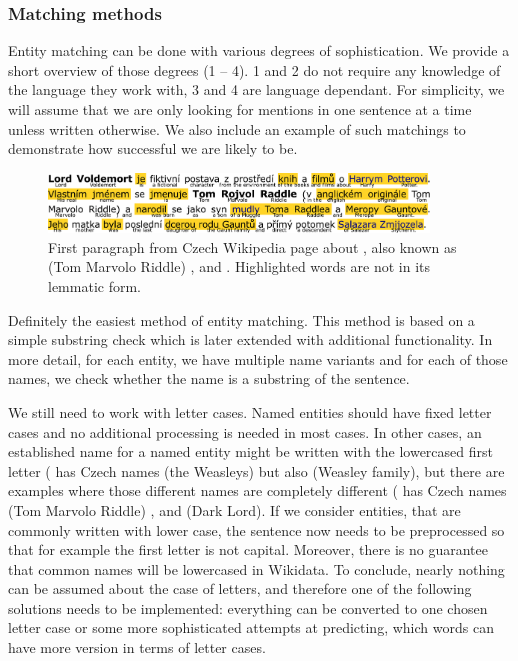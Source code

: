\subsubsection{Matching methods}
Entity matching can be done with various degrees of sophistication. We provide a short overview of those degrees (1 -- 4). 1 and 2 do not require any knowledge of the language they work with, 3 and 4 are language dependant. For simplicity, we will assume that we are only looking for mentions in one sentence at a time unless written otherwise. We also include an example of such matchings to demonstrate how successful we are likely to be.

\begin{figure}
\centering
\includegraphics[width = 0.9\textwidth]{./img/Voldemort_infinitivy_preklad}

\caption{First paragraph from Czech Wikipedia page about , also known as  (Tom Marvolo Riddle) , and . Highlighted words are not in its lemmatic form. }
\label{obr:Voldemort_preklad}

\end{figure}


 Definitely the easiest method of entity matching. This method is based on a simple substring check which is later extended with additional functionality. In more detail, for each entity, we have multiple name variants and for each of those names, we check whether the name is a substring of the sentence.



We still need to work with letter cases. Named entities should have fixed letter cases and no additional processing is needed in most cases. In other cases, an established name for a named entity might be written with the lowercased first letter ( has Czech names  (the Weasleys) but also  (Weasley family), but there are examples where those different names are completely different ( has Czech names  (Tom Marvolo Riddle) , and  (Dark Lord). If we consider entities, that are commonly written with lower case, the sentence now needs to be preprocessed so that for example the first letter is not capital. Moreover, there is no guarantee that common names will be lowercased in Wikidata. To conclude, nearly nothing can be assumed about the case of letters, and therefore one of the following solutions needs to be implemented: everything can be converted to one chosen letter case or some more sophisticated attempts at predicting, which words can have more version in terms of letter cases.

